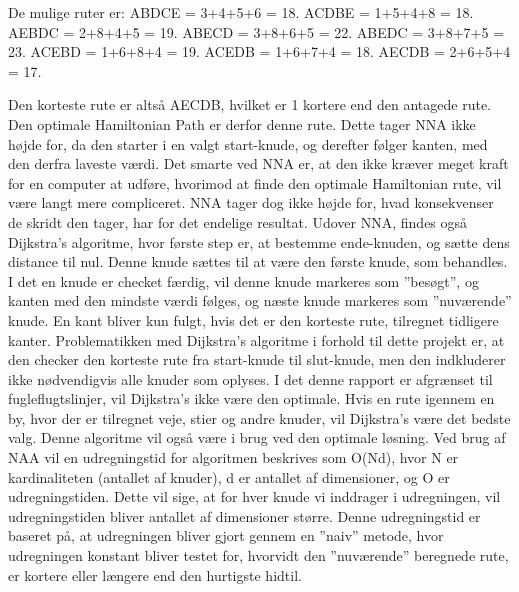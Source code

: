De mulige ruter er: \newline
ABDCE = 3+4+5+6 = 18. \newline
ACDBE = 1+5+4+8 = 18. \newline
AEBDC = 2+8+4+5 = 19. \newline
ABECD = 3+8+6+5 = 22. \newline
ABEDC = 3+8+7+5 = 23. \newline
ACEBD = 1+6+8+4 = 19. \newline
ACEDB = 1+6+7+4 = 18. \newline
AECDB = 2+6+5+4 = 17. \newline

Den korteste rute er altså AECDB, hvilket er 1 kortere end den antagede rute. Den optimale Hamiltonian Path er derfor denne rute. Dette tager NNA ikke højde for, da den starter i en valgt start-knude, og derefter følger kanten, med den derfra laveste værdi. Det smarte ved NNA er, at den ikke kræver meget kraft for en computer at udføre, hvorimod at finde den optimale Hamiltonian rute, vil være langt mere compliceret. NNA tager dog ikke højde for, hvad konsekvenser de skridt den tager, har for det endelige resultat.
Udover NNA, findes også Dijkstra’s algoritme, hvor første step er, at bestemme ende-knuden, og sætte dens distance til nul. Denne knude sættes til at være den første knude, som behandles. I det en knude er checket færdig, vil denne knude markeres som ”besøgt”, og kanten med den mindste værdi følges, og næste knude markeres som ”nuværende” knude. En kant bliver kun fulgt, hvis det er den korteste rute, tilregnet tidligere kanter.
Problematikken med Dijkstra’s algoritme i forhold til dette projekt er, at den checker den korteste rute fra start-knude til slut-knude, men den indkluderer ikke nødvendigvis alle knuder som oplyses. I det denne rapport er afgrænset til fugleflugtslinjer, vil Dijkstra’s ikke være den optimale. Hvis en rute igennem en by, hvor der er tilregnet veje, stier og andre knuder, vil Dijkstra’s være det bedste valg. Denne algoritme vil også være i brug ved den optimale løsning.
Ved brug af NAA vil en udregningstid for algoritmen beskrives som O(Nd), hvor N er kardinaliteten (antallet af knuder),  d er antallet af dimensioner, og O er udregningstiden. Dette vil sige, at for hver knude vi inddrager i udregningen, vil udregningstiden bliver antallet af dimensioner større. Denne udregningstid er baseret på, at udregningen bliver gjort gennem en ”naiv” metode, hvor udregningen konstant bliver testet for, hvorvidt den ”nuværende” beregnede rute, er kortere eller længere end den hurtigste hidtil.

